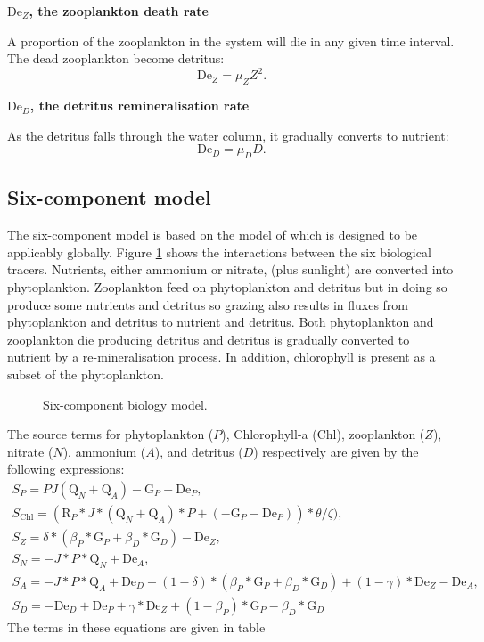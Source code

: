 \textbf{$\mathrm{De}_Z$, the zooplankton death rate}\label{sec:De_Z}

A proportion of the zooplankton in the system will die in any given time
interval. The dead zooplankton become detritus:
\begin{equation}
  \mathrm{De}_Z=\mu_Z Z^2.
\end{equation}

\textbf{$\mathrm{De}_D$, the detritus remineralisation rate}\label{sec:De_D}

As the detritus falls through the water column, it gradually converts to
nutrient:
\begin{equation}
  \mathrm{De}_D=\mu_D D.
\end{equation}

\subsection{Six-component model}
\label{sect:bio-6-component}

The six-component model is based on the model of \citet{popova2006}
which is designed to be applicably globally. 
Figure \ref{fig:biofluxes6} shows the interactions between the six
biological tracers. Nutrients, either ammonium or nitrate, (plus sunlight) are converted into
phytoplankton. Zooplankton feed on phytoplankton and detritus but in doing
so produce some nutrients and detritus so grazing also results in fluxes
from phytoplankton and detritus to nutrient and detritus. Both phytoplankton
and zooplankton die producing detritus and detritus is gradually converted to
nutrient by a re-mineralisation process. In addition, chlorophyll is present
as a subset of the phytoplankton.

\begin{figure}[ht]
  \centering
  \caption{Six-component biology model.}
  \label{fig:biofluxes6}
\end{figure}


The source terms for phytoplankton ($P$), Chlorophyll-a ($\mathrm{Chl}$), zooplankton ($Z$), nitrate ($N$),
ammonium ($A$), and detritus ($D$) respectively are given by the following expressions:
\begin{gather}\label{eq:bio6_sources}
  S_P=PJ(\mathrm{Q}_N+\mathrm{Q}_A) - \mathrm{G}_P - \mathrm{De}_P,\\
  S_{\mathrm{Chl}}=(\mathrm{R}_P*J*(\mathrm{Q}_N+\mathrm{Q}_A)*P + 
      (-\mathrm{G}_P-\mathrm{De}_P))*\theta/\zeta),\\
  S_Z=\delta*(\beta_P*\mathrm{G}_P+\beta_D*\mathrm{G}_D) - \mathrm{De}_Z,\\
  S_N=-J*P*\mathrm{Q}_N+\mathrm{De}_A,\\
  S_A=-J*P*\mathrm{Q}_A + \mathrm{De}_D + (1 - \delta)*(\beta_P*\mathrm{G}_P + \beta_D*\mathrm{G}_D) + (1-\gamma)*\mathrm{De}_Z-\mathrm{De}_A,\\
  S_D=-\mathrm{De}_D + \mathrm{De}_P + \gamma*\mathrm{De}_Z +(1-\beta_P)*\mathrm{G}_P - \beta_D*\mathrm{G}_D
\end{gather}
The terms in these equations are given in table 

